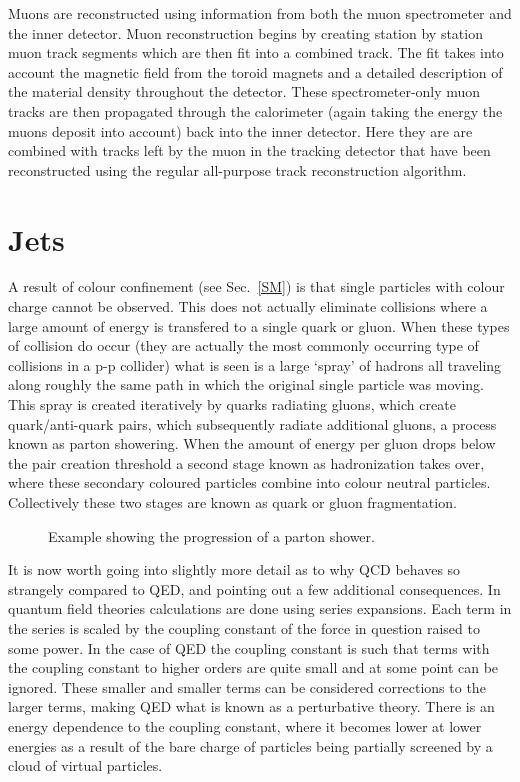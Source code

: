 Muons are reconstructed using information from both the muon spectrometer and the inner detector.  
Muon reconstruction begins by creating station by station muon track segments which are then fit into a combined track.  
The fit takes into account the magnetic field from the toroid magnets and a detailed description of the material density throughout the detector.  
These spectrometer-only muon tracks are then propagated through the calorimeter (again taking the energy the muons deposit into account) back into the inner detector.  
Here they are are combined with tracks left by the muon in the tracking detector that have been reconstructed using the regular all-purpose track reconstruction algorithm.  

\section{Jets}
\label{jets}

A result of colour confinement (see Sec.~\ref{SM}) is that single particles with colour charge cannot be observed.  
This does not actually eliminate collisions where a large amount of energy is transfered to a single quark or gluon.  
When these types of collision do occur (they are actually the most commonly occurring type of collisions in a p-p collider) what is seen is a large `spray' of hadrons all traveling along roughly the same path in which the original single particle was moving.  
This spray is created iteratively by quarks radiating gluons, which create quark/anti-quark pairs, which subsequently radiate additional gluons, a process known as parton showering.  
When the amount of energy per gluon drops below the pair creation threshold a second stage known as hadronization takes over, where these secondary coloured particles combine into colour neutral particles.  
Collectively these two stages are known as quark or gluon fragmentation.  

\begin{figure}[!ht]
  \begin{center}
  \end{center}
  \caption[Parton showering diagram]
  {\small Example showing the progression of a parton shower.  }
\end{figure}

It is now worth going into slightly more detail as to why QCD behaves so strangely compared to QED, and pointing out a few additional consequences.  
In quantum field theories calculations are done using series expansions.  
Each term in the series is scaled by the coupling constant of the force in question raised to some power.  
In the case of QED the coupling constant is such that terms with the coupling constant to higher orders are quite small and at some point can be ignored.  
These smaller and smaller terms can be considered corrections to the larger terms, making QED what is known as a perturbative theory.  
There is an energy dependence to the coupling constant, where it becomes lower at lower energies as a result of the bare charge of particles being partially screened by a cloud of virtual particles.  

